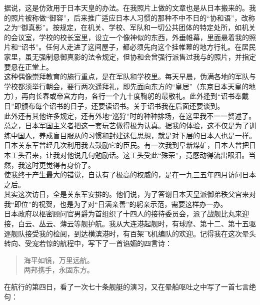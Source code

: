 据说，这是仿效用于日本天皇的办法。在我照片上做的文章也是从日本搬来的。我的照片被称做“御容”，后来推广适应日本人习惯的那种不中不日的“协和语”，改称之为“御真影”。按规定，在机关、学校、军队和一切公共团体的特定处所，如机关的会议室，学校的校长室里，设立一个像神似的东西，外垂帷幕，里面悬着我的照片和“诏书”。任何人走进了这间屋子，都必须先向这个挂帷幕的地方行礼。在居民家里，虽无强制悬御真影的法令规定，但协和会曾强行派售过我与的照片，并指定要悬在正堂上。\\

这种偶像崇拜教育的施行重点，是在军队和学校里。每天早晨，伪满各地的军队与学校都须举行朝会，要行两次遥拜礼，即先面向东方的“皇居”（东京日本天皇的地方），再向长春或帝宫方向，各行一个九十度鞠躬的最敬礼。此外逢到“诏书奉戴日”即颁布每个诏书的日子，还要读诏书。关于诏书我在后面还要谈到。\\

此外还有其他许多规定，还有外地“巡狩”时的种种排场，在这里我不一一赘述了。总之，日本军国主义者把这一套玩艺做得极为认真。据我的体验，这不仅是为了训练中国人，养成盲目服从的习惯和封建迷信思想，就是对下层的日本人也是一样。日本关东军曾经几次利用我去鼓励它的臣民。有一次我到阜新煤矿，日本人曾把日本工头召来，让我对他说几句勉励话。这工头受此“殊荣”，竟感动得流出眼泪。当然，我这时更觉得有身价了。\\

使我终于产生最大的错觉，自认有了极高的权威的，是在一九三五年四月访问日本之后。\\

其实这次访日，全是关东军安排的。他们说，为了答谢日本天皇派御弟秩父宫来对我“即位”的祝贺，也是为了对“日满亲善”的躬亲示范，需要这样办一办。\\

日本政府以枢密顾问官男爵为首组织了十四人的接待委员会，派了战舰比丸来迎接，白云、丛云、薄云等舰护航。我从大连港起舰时，有球摩、第十二、第十五驱逐舰队接受我的检阅，到达横滨港时，有百架飞机编队的欢迎。记得我在这次晕头转向、受宠若惊的航程中，写下了一首谄媚的四言诗：\\

\begin{quote}
	海平如镜，万里远航。\\

两邦携手，永固东方。\\

\end{quote}
在航行的第四日，看了一次七十条舰艇的演习，又在晕船呕吐之中写了一首七言绝句：\\

